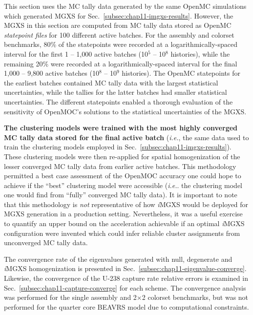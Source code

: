 This section uses the \ac{MC} tally data generated by the same OpenMC simulations which generated \ac{MGXS} for Sec.~\ref{subsec:chap11-imgxs-results}. However, the \ac{MGXS} in this section are computed from \ac{MC} tally data stored as OpenMC \textit{statepoint files} for 100 different active batches. For the assembly and colorset benchmarks, 80\% of the statepoints were recorded at a logarithmically-spaced interval for the first 1 -- 1,000 active batches (10$^{5}$ -- 10$^{8}$ histories), while the remaining 20\% were recorded at a logarithmically-spaced interval for the final 1,000 -- 9,800 active batches (10$^{8}$ -- 10$^{9}$ histories). The OpenMC statepoints for the earliest batches contained \ac{MC} tally data with the largest statistical uncertainties, while the tallies for the latter batches had smaller statistical uncertainties. The different statepoints enabled a thorough evaluation of the sensitivity of OpenMOC's solutions to the statistical uncertainties of the \ac{MGXS}.

\textbf{The clustering models were trained with the most highly converged \ac{MC} tally data stored for the final active batch} (\textit{i.e.}, the same data used to train the clustering models employed in Sec.~\ref{subsec:chap11-imgxs-results}). These clustering models were then re-applied for spatial homogenization of the lesser converged \ac{MC} tally data from earlier active batches. This methodology permitted a best case assessment of the OpenMOC accuracy one could hope to achieve if the ``best'' clustering model were accessible (\textit{i.e.}. the clustering model one would find from ``fully'' converged \ac{MC} tally data). It is important to note that this methodology is \textit{not} representative of how \textit{i}\ac{MGXS} would be deployed for \ac{MGXS} generation in a production setting. Nevertheless, it was a useful exercise to quantify an upper bound on the acceleration achievable if an optimal \textit{i}\ac{MGXS} configuration were invented which could infer reliable cluster assignments from unconverged \ac{MC} tally data.


The convergence rate of the eigenvalues generated with null, degenerate and \textit{i}\ac{MGXS} homogenization is presented in Sec.~\ref{subsec:chap11-eigenvalue-converge}. Likewise, the convergence of the U-238 capture rate relative errors is examined in Sec.~\ref{subsec:chap11-capture-converge} for each scheme. The convergence analysis was performed for the single assembly and 2$\times$2 colorset benchmarks, but was not performed for the quarter core \ac{BEAVRS} model due to computational constraints.

